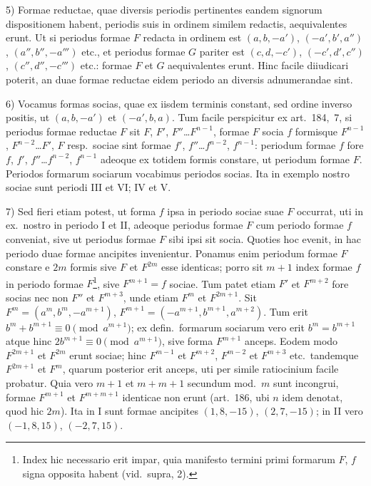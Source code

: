 \documentclass[12pt,a4paper]{article}
\theoremstyle{plain}
\begin{document}
5) Formae reductae, quae diversis periodis pertinentes eandem signorum dispositionem habent, periodis suis in ordinem similem redactis, aequivalentes erunt. Ut si periodus formae $F$ redacta in ordinem est $(a, b, -a')$, $(-a', b', a'')$, $(a'', b'', -a''')$ etc., et periodus formae $G$ pariter est $(c, d, -c')$, $(-c', d', c'')$, $(c'', d'', -c''')$ etc.: formae $F$ et $G$ aequivalentes erunt. Hinc facile diiudicari poterit, an duae formae reductae eidem periodo an diversis adnumerandae sint.

6) Vocamus formas socias, quae ex iisdem terminis constant, sed ordine inverso positis, ut $(a, b, -a')$ et $(-a', b, a)$. Tum facile perspicitur ex art.~184,~7, si periodus formae reductae $F$ sit $F$, $F'$, $F''$\ldots$F^{n-1}$, formae $F$ socia $f$ formisque $F^{n-1}$, $F^{n-2}$\ldots$F'$, $F$ resp.~sociae sint formae $f'$, $f''$\ldots$f^{n-2}$, $f^{n-1}$: periodum formae $f$ fore $f$, $f'$, $f''$\ldots$f^{n-2}$, $f^{n-1}$ adeoque ex totidem formis constare, ut periodum formae $F$. Periodos formarum sociarum vocabimus periodos socias. Ita in exemplo nostro sociae sunt periodi III et VI; IV et V.

7) Sed fieri etiam potest, ut forma $f$ ipsa in periodo sociae suae $F$ occurrat, uti in ex.~nostro in periodo I et II, adeoque periodus formae $F$ cum periodo formae $f$ conveniat, sive ut periodus formae $F$ sibi ipsi sit socia. Quoties hoc evenit, in hac periodo duae formae ancipites invenientur. Ponamus enim periodum formae $F$ constare e $2m$ formis sive $F$ et $F^{2m}$ esse identicas; porro sit $m+1$ index formae $f$ in periodo formae $F$\footnote{Index hic necessario erit impar, quia manifesto termini primi formarum $F$, $f$ signa opposita habent (vid.~supra, 2).}, sive $F^{m+1} = f$ sociae. Tum patet etiam $F'$ et $F^{m+2}$ fore socias nec non $F''$ et $F^{m+3}$, unde etiam $F^m$ et $F^{2m+1}$. Sit $F^m = (a^m, b^m, -a^{m+1})$, $F^{m+1} = (-a^{m+1}, b^{m+1}, a^{m+2})$. Tum erit $b^m + b^{m+1} \equiv 0 \pmod{a^{m+1}}$; ex defin.~formarum sociarum vero erit $b^m = b^{m+1}$ atque hinc $2b^{m+1} \equiv 0 \pmod{a^{m+1}}$, sive forma $F^{m+1}$ anceps. Eodem modo $F^{2m+1}$ et $F^{2m}$ erunt sociae; hinc $F^{m-1}$ et $F^{m+2}$, $F^{m-2}$ et $F^{m+3}$ etc.~tandemque $F^{2m+1}$ et $F^{m}$, quarum posterior erit anceps, uti per simile ratiocinium facile probatur. Quia vero $m+1$ et $m+m+1$ secundum mod.~$m$ sunt incongrui, formae $F^{m+1}$ et $F^{m+m+1}$ identicae non erunt (art.~186, ubi $n$ idem denotat, quod hic $2m$). Ita in I sunt formae ancipites $(1, 8, -15)$, $(2, 7, -15)$; in II vero $(-1, 8, 15)$, $(-2, 7, 15)$.
\end{document}
